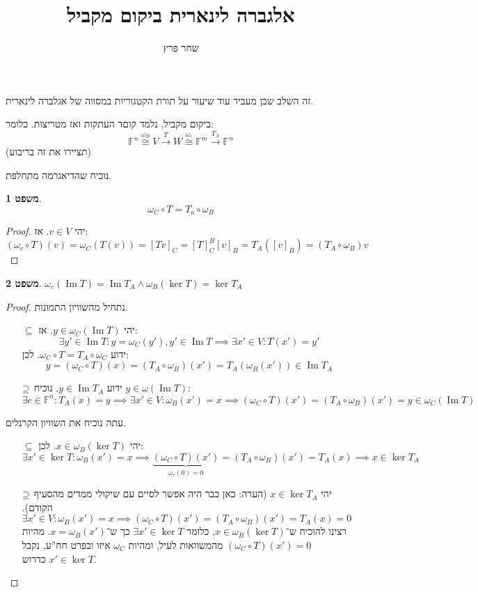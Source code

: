 \documentclass[]{article}
\author{שחר פרץ}
\title{אלגברה לינארית ביקום מקביל}
\DeclareMathOperator\Img   {Im}
\newcommand\F         {\mathbb{F}}
\newcommand\co        {\colon}
\newcommand\wg        {\omega}
\newtheorem{Theorem}{משפט}
\theoremstyle{definition}
\newcommand\theo  [1] {\begin{Theorem}#1\end{Theorem}}
\begin{document}
	\maketitle
	זה השלב שבן מעביר עוד שיעור על תורת הקטגוריות במסווה של אגלברה לינארית. 
	
	ביקום מקביל, נלמד קוםד העתקות ואז מטריצות. כלומר: 
	\[ \F^{n} \overset{\wg_B}{\cong} V \overset{T}{\to} W \overset{\wg_c}{\cong} \F^{m} \overset{T_A}{\to} \F^n \]
	(תציירו את זה בריבוע)
	
	נוכיח שהדיאגרמה מתחלפת. 
	\theo{\[ \wg_C \circ T = T_a \circ \wg_B \]}
	\begin{proof}
		יהי $v \in V$. אז: 
		\[ (\wg_c \circ T)(v) = \wg_C(T(v)) = [Tv]_C = [T]^B_C[v]_B = T_A([v]_B) = (T_A \circ \wg_B)v \]
	\end{proof}
	\theo{$\wg_c(\Img T) = \Img T_A \land \wg_B(\ker T) = \ker T_A$}\begin{proof}
		נתחיל מהשוויון התמונות. 
		\begin{itemize}
			\item[$\subseteq$]יהי $y \in \wg_C(\Img T)$. אז: 
			\[ \exists y' \in \Img T\co y = \wg_C(y'), y' \in \Img T \implies \exists x' \in V \co T(x') = y' \]
			ידוע $\wg_C \circ T = T_A \circ \wg_C$. לכן: 
			\[ y = (\wg_C \circ T)(x) = (T_A \circ \wg_B)(x') = T_A(\wg_B(x')) \in \Img T_A \]
			\item[$\reflectbox{$\subseteq$}$] ידוע $y \in \Img T_A$. נוכיח $y \in \wg(\Img T)$: 
			\[ \exists c \in \F^{n} \co T_A(x) = y \implies \exists x' \in V \co \wg_B(x') = x \implies (\wg_C \circ T)(x') = (T_A \circ \wg_B)(x') = y \in \wg_C(\Img T) \]
		\end{itemize}
		עתה נוכיח את השוויון הקרנלים. 
		\begin{itemize}
			\item[$\subseteq$]יהי $x \in \wg_B(\ker T)$. לכן:
			\[ \exists x' \in \ker T \co \wg_B(x') = x \implies \underbrace{(\wg_C \circ T)(x')}_{\wg_c(0) = 0} = (T_A \circ \wg_B)(x') = T_A(x) \implies x\in \ker T_A \]
			\item[$\reflectbox{$\subseteq$}$]יהי $x \in \ker T_A$ (הערה: כאן כבר היה אפשר לסיים עם שיקולי ממדים מהסעיף הקודם). 
			$\exists x' \in V \co \wg_B(x') = x \implies (\wg_C \circ T)(x') = (T_A \circ \wg_B)(x') = T_A(x) = 0$
			רצינו להוכיח ש־$x \in \wg_B(\ker T)$, כלומר $\exists x' \in \ker T$ כך ש־$x = \wg_B(x')$. מהיות $(\wg_C \circ T)(x') = 0$ מהמשוואות לעיל, ומהיות $\wg_C$ איזו ובפרט חח''ע, נקבל $x' \in \ker T$ כדרוש. 
		\end{itemize}
	\end{proof}
	
\end{document}
